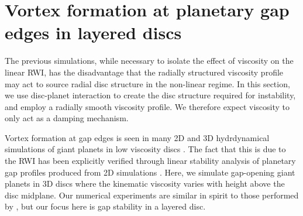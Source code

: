 \section{Vortex formation at planetary gap edges in layered
  discs}\label{disc-planet} 
The previous simulations, while necessary to isolate the effect of 
viscosity on the linear RWI, has the disadvantage that the radially
structured viscosity profile may act to source radial disc structure
in the non-linear regime. In this section, we use disc-planet interaction to
create the disc structure required for instability, and employ a radially smooth
viscosity profile. We therefore expect viscosity to only
act as a damping mechanism. %

Vortex formation at gap edges is seen in many  
2D and 3D hydrdynamical simulations of giant planets in low viscosity discs 
\citep{valborro07,lin10,lin11a,lin12}. The fact that this is due to
the RWI has been explicitly verified through linear stability
analysis of planetary gap profiles produced from 2D simulations
\citep{valborro07,lin10}. Here, we simulate gap-opening giant planets
in 3D discs where the kinematic viscosity varies with height above the
disc midplane. Our numerical experiments are similar in spirit to
those performed by \cite{pierens10}, but our focus here is gap
stability in a layered disc. 
 



